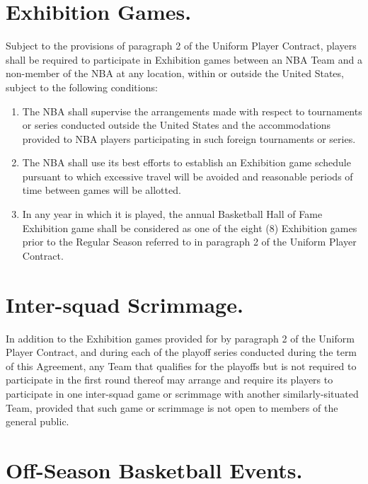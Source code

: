 \documentclass[
]{book}
\providecommand{\tightlist}{%
  \setlength{\itemsep}{0pt}\setlength{\parskip}{0pt}}
\begin{document}

\hypertarget{exhibition-games.-1}{%
\section{Exhibition Games.}\label{exhibition-games.-1}}

Subject to the provisions of paragraph 2 of the Uniform Player Contract, players shall be required to participate in Exhibition games between an NBA Team and a non-member of the NBA at any location, within or outside the United States, subject to the following conditions:

\begin{enumerate}
\def\labelenumi{(\alph{enumi})}
\tightlist
\item
  The NBA shall supervise the arrangements made with respect to tournaments or series conducted outside the United States and the accommodations provided to NBA players participating in such foreign tournaments or series.
\item
  The NBA shall use its best efforts to establish an Exhibition game schedule pursuant to which excessive travel will be avoided and reasonable periods of time between games will be allotted.
\item
  In any year in which it is played, the annual Basketball Hall of Fame Exhibition game shall be considered as one of the eight (8) Exhibition games prior to the Regular Season referred to in paragraph 2 of the Uniform Player Contract.
\end{enumerate}

\hypertarget{inter-squad-scrimmage.}{%
\section{Inter-squad Scrimmage.}\label{inter-squad-scrimmage.}}

In addition to the Exhibition games provided for by paragraph 2 of the Uniform Player Contract, and during each of the playoff series conducted during the term of this Agreement, any Team that qualifies for the playoffs but is not required to participate in the first round thereof may arrange and require its players to participate in one inter-squad game or scrimmage with another similarly-situated Team, provided that such game or scrimmage is not open to members of the general public.

\hypertarget{off-season-basketball-events.}{%
\section{Off-Season Basketball Events.}\label{off-season-basketball-events.}}
\end{document}
